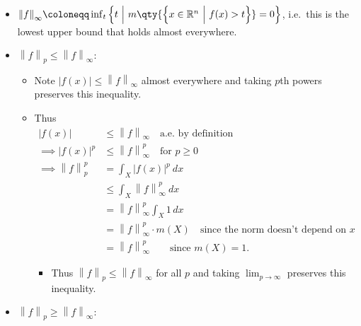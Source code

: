 \begin{solution}

\hfill

\begin{concept}

\hfill

\begin{itemize}
\tightlist
\item
  \({\left\lVert {f} \right\rVert}_\infty \coloneqq\inf_t {\left\{{ t{~\mathrel{\Big|}~}m\qty{\left\{{x\in {\mathbb{R}}^n {~\mathrel{\Big|}~}f(x) > t}\right\}} = 0 }\right\} }\),
  i.e.~this is the lowest upper bound that holds almost everywhere.
\end{itemize}

\end{concept}

\begin{itemize}
\tightlist
\item
  \({\left\lVert {f} \right\rVert}_p \leq {\left\lVert {f} \right\rVert}_\infty\):

  \begin{itemize}
  \item
    Note
    \({\left\lvert {f(x)} \right\rvert} \leq {\left\lVert {f} \right\rVert}_\infty\)
    almost everywhere and taking \(p\)th powers preserves this
    inequality.
  \item
    Thus
    \begin{align*}
    {\left\lvert {f(x)} \right\rvert} &\leq {\left\lVert {f} \right\rVert}_\infty \quad\text{a.e. by definition} \\
    \implies 
    {\left\lvert {f(x)} \right\rvert}^p &\leq {\left\lVert {f} \right\rVert}_\infty^p \quad\text{for } p\geq 0 \\  
    \implies
    {\left\lVert {f} \right\rVert}_p^p 
    &= \int_X {\left\lvert {f(x)} \right\rvert}^p ~dx \\
    &\leq \int_X {\left\lVert {f} \right\rVert}_\infty^p ~dx  \\
    &= {\left\lVert {f} \right\rVert}_\infty^p \int_X 1\,dx \\ 
    &= {\left\lVert {f} \right\rVert}_\infty^p \cdot m(X) \quad\text{since the norm doesn't depend on }x \\
    &= {\left\lVert {f} \right\rVert}_\infty^p \qquad \text{since } m(X) = 1
    .\end{align*}

    \begin{itemize}
    \tightlist
    \item
      Thus
      \({\left\lVert {f} \right\rVert}_p \leq {\left\lVert {f} \right\rVert}_\infty\)
      for all \(p\) and taking \(\lim_{p\to\infty}\) preserves this
      inequality.
    \end{itemize}
  \end{itemize}
\item
  \({\left\lVert {f} \right\rVert}_p \geq {\left\lVert {f} \right\rVert}_\infty\):


\end{itemize}
\end{solution}
